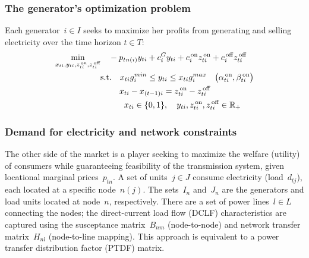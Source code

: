 \documentclass[9pt,a4paper]{article}
\newcommand{\st}{\text{s.t.} \quad}
\newcommand{\on}{^{\,\text{on}}}
\newcommand{\off}{^{\,\text{off}}}
\begin{document}
\subsubsection*{The generator's optimization problem}
Each generator~$i \in I$ seeks to maximize her profits from generating and selling electricity over the time horizon $t \in T$:
\begin{subequations} \label{example:generator:optimization}
\begin{align} 
\min_{x_{ti},y_{ti},z\on_{ti},z\off_{ti}} &\quad  - p_{tn(i)} y_{ti} + c^G_{i} y_{ti} + c\on_{i} z\on_{ti} + c\off_{i} z\off_{ti}  \label{example:generator:objective} \\
&\st x_{ti} g_i^{min} \leq y_{ti} \leq x_{ti} g_i^{max} \quad \big(\alpha\on_{ti},\beta\on_{ti}\big)  \label{example:generator:con:generation} \\
& \hspace{0.8 cm} x_{ti} - x_{(t-1)i} = z\on_{ti} - z\off_{ti} \label{example:generator:con:intertemporal} \\
& \hspace{1 cm} x_{ti} \in \{0,1\}, \quad y_{ti},z\on_{ti},z\off_{ti}  \in \mathbb{R}_+ \nonumber
\end{align}
\end{subequations}


\subsubsection*{Demand for electricity and network constraints}
The other side of the market is a player seeking to maximize the welfare (utility) of consumers while guaranteeing feasibility of the transmission system, given locational marginal prices~$p_{tn}$.
A set of units~$j \in J$ consume electricity (load~$d_{tj}$), each located at a specific node~$n(j)$. The sets~$I_n$ and~$J_n$ are the generators and load units located at node~$n$, respectively. There are a set of power lines~$l \in L$ connecting the nodes; the direct-current load flow (DCLF) characteristics are captured using the susceptance matrix~$B_{nm}$ (node-to-node) and network transfer matrix~$H_{nl}$ (node-to-line mapping). This approach is equivalent to a power transfer distribution factor (PTDF) matrix. 
\setcounter{equation}{17}
\end{document}
